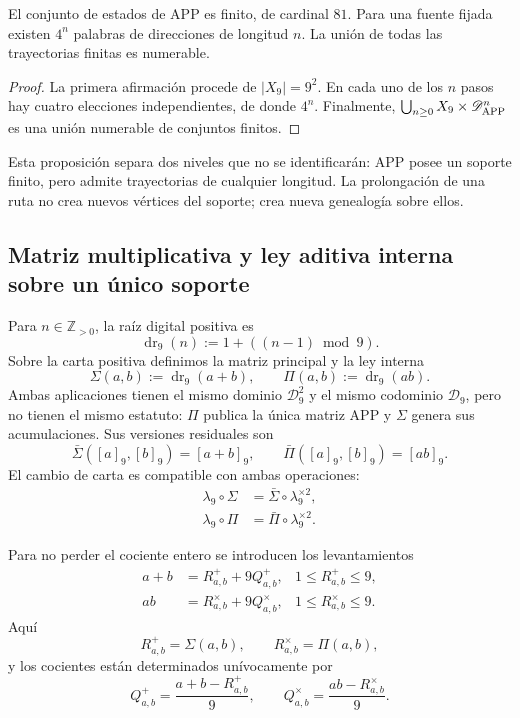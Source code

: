 \begin{proposition}
\label{p12-83-c1-s2:prop:app-soporte-finito-trayectorias-numerables}
El conjunto de estados de APP es finito, de cardinal \(81\). Para una fuente
fijada existen \(4^n\) palabras de direcciones de longitud \(n\). La unión
de todas las trayectorias finitas es numerable.
\end{proposition}

\begin{proof}
La primera afirmación procede de \(|X_9|=9^2\). En cada uno de los \(n\)
pasos hay cuatro elecciones independientes, de donde \(4^n\). Finalmente,
\(\bigcup_{n\geq0}X_9\times\mathscr D_{\rm APP}^n\) es una unión numerable
de conjuntos finitos.
\end{proof}

Esta proposición separa dos niveles que no se identificarán: APP posee un
soporte finito, pero admite trayectorias de cualquier longitud. La
prolongación de una ruta no crea nuevos vértices del soporte; crea nueva
genealogía sobre ellos.

\subsection{Matriz multiplicativa y ley aditiva interna sobre un único soporte}

Para \(n\in\mathbb Z_{>0}\), la raíz digital positiva es
\[
 \operatorname{dr}_9(n):=1+((n-1)\bmod9).
\]
Sobre la carta positiva definimos la matriz principal y la ley interna
\[
 \Sigma(a,b):=\operatorname{dr}_9(a+b),
 \qquad
 \Pi(a,b):=\operatorname{dr}_9(ab).
\]
Ambas aplicaciones tienen el mismo dominio \(\mathcal D_9^2\) y el mismo
codominio \(\mathcal D_9\), pero no tienen el mismo estatuto: \(\Pi\) publica
la única matriz APP y \(\Sigma\) genera sus acumulaciones. Sus versiones residuales
son
\[
 \bar\Sigma([a]_9,[b]_9)=[a+b]_9,
 \qquad
 \bar\Pi([a]_9,[b]_9)=[ab]_9.
\]
El cambio de carta es compatible con ambas operaciones:
\begin{align*}
 \lambda_9\circ\Sigma
   &=\bar\Sigma\circ\lambda_9^{\times2},\\
 \lambda_9\circ\Pi
   &=\bar\Pi\circ\lambda_9^{\times2}.
\end{align*}

Para no perder el cociente entero se introducen los levantamientos
\begin{align}
 a+b &= R^+_{a,b}+9Q^+_{a,b},
 &1\leq R^+_{a,b}\leq9,
\label{p12-83-c1-s2:eq:app-lift-suma}\\
 ab &= R^\times_{a,b}+9Q^\times_{a,b},
 &1\leq R^\times_{a,b}\leq9.
\label{p12-83-c1-s2:eq:app-lift-producto}
\end{align}
Aquí
\[
 R^+_{a,b}=\Sigma(a,b),
 \qquad
 R^\times_{a,b}=\Pi(a,b),
\]
y los cocientes están determinados unívocamente por
\[
 Q^+_{a,b}=\frac{a+b-R^+_{a,b}}9,
 \qquad
 Q^\times_{a,b}=\frac{ab-R^\times_{a,b}}9.
\]

